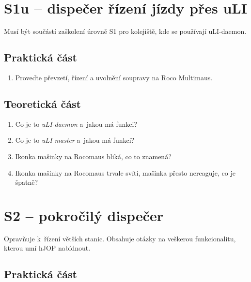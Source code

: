 \documentclass[12pt,a4paper]{article}
\begin{document}
\newpage
\section{S1u – dispečer řízení jízdy přes uLI}

Musí být součástí zaškolení úrovně S1 pro kolejiště, kde se používají
uLI-daemon.

\subsection{Praktická část}

\begin{enumerate}[leftmargin=*]
\item Proveďte převzetí, řízení a uvolnění soupravy na Roco Multimaus.
\end{enumerate}

\subsection{Teoretická část}

\begin{enumerate}[leftmargin=*]
\item Co je to \textit{uLI-daemon} a~jakou má funkci?
\item Co je to \textit{uLI-master} a~jakou má funkci?
\item Ikonka mašinky na Rocomaus bliká, co to znamená?
\item Ikonka mašinky na Rocomaus trvale svítí, mašinka přesto nereaguje, co je
špatně?
\end{enumerate}


\newpage
\section{S2 – pokročilý dispečer}

Opravňuje k~řízení větších stanic. Obsahuje otázky na veškerou funkcionalitu,
kterou umí hJOP nabídnout.

\subsection{Praktická část}
\end{document}
